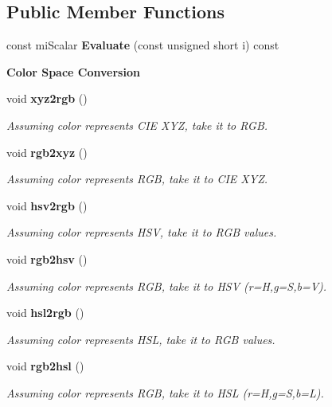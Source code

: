 \subsection*{Public Member Functions}
\begin{CompactItemize}
\item 
const mi\-Scalar {\bf Evaluate} (const unsigned short i) const 
\end{CompactItemize}
\begin{Indent}{\bf Color Space Conversion}\par
\begin{CompactItemize}
\item 
void {\bf xyz2rgb} ()
\begin{CompactList}\small\item\em Assuming color represents CIE XYZ, take it to RGB. \item\end{CompactList}\item 
void {\bf rgb2xyz} ()
\begin{CompactList}\small\item\em Assuming color represents RGB, take it to CIE XYZ. \item\end{CompactList}\item 
void {\bf hsv2rgb} ()
\begin{CompactList}\small\item\em Assuming color represents HSV, take it to RGB values. \item\end{CompactList}\item 
void {\bf rgb2hsv} ()
\begin{CompactList}\small\item\em Assuming color represents RGB, take it to HSV (r=H,g=S,b=V). \item\end{CompactList}\item 
void {\bf hsl2rgb} ()
\begin{CompactList}\small\item\em Assuming color represents HSL, take it to RGB values. \item\end{CompactList}\item 
void {\bf rgb2hsl} ()
\begin{CompactList}\small\item\em Assuming color represents RGB, take it to HSL (r=H,g=S,b=L). \item\end{CompactList}\item 

\end{CompactItemize}
\end{Indent}
